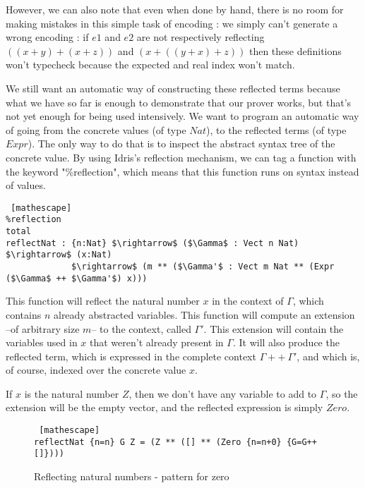 However, we can also note that even when done by hand, there is no room for making mistakes in this simple task of encoding : we simply can't generate a wrong encoding : if $e1$ and $e2$ are not respectively reflecting $((x+y) + (x+z))$ and $(x + ((y + x) + z))$ then these definitions won't typecheck because the expected and real index won't match.

We still want an automatic way of constructing these reflected terms because what we have so far is enough to demonstrate that our prover works, but that's not yet enough for being used intensively. We want to program an automatic way of going from the concrete values (of type $Nat$), to the reflected terms (of type $Expr$). The only way to do that is to inspect the abstract syntax tree of the concrete value.
By using Idris's reflection mechanism, we can tag a function with the keyword "\%reflection", which means that this function runs on syntax instead of values. 


\begin{lstlisting} [mathescape]
%reflection
total
reflectNat : {n:Nat} $\rightarrow$ ($\Gamma$ : Vect n Nat) $\rightarrow$ (x:Nat) 
             $\rightarrow$ (m ** ($\Gamma'$ : Vect m Nat ** (Expr ($\Gamma$ ++ $\Gamma'$) x)))
\end{lstlisting}


This function will reflect the natural number $x$ in the context of $\Gamma$, which contains $n$ already abstracted variables. This function will compute an extension --of arbitrary size $m$-- to the context, called $\Gamma'$. This extension will contain the variables used in $x$ that weren't already present in $\Gamma$. It will also produce the reflected term, which is expressed in the complete context $\Gamma ++\ \Gamma'$, and which is, of course, indexed over the concrete value $x$.

If $x$ is the natural number $Z$, then we don't have any variable to add to $\Gamma$, so the extension will be the empty vector, and the reflected expression is simply $Zero$.

 \begin{figure}[H]
\figrule
\begin{center}
\begin{lstlisting} [mathescape]
reflectNat {n=n} G Z = (Z ** ([] ** (Zero {n=n+0} {G=G++[]})))
\end{lstlisting}
\end{center}
\caption{Reflecting natural numbers - pattern for zero}
\label{reflectNat_pattern1}
\figrule
\end{figure}


